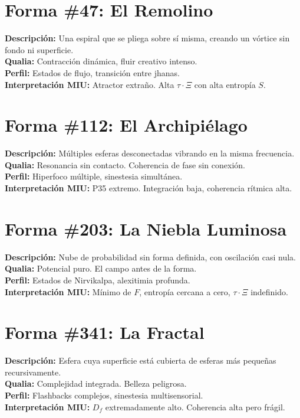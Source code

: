 \documentclass[12pt,openany]{book}
\begin{document}
\section{Forma \#47: El Remolino}
\textbf{Descripción:} Una espiral que se pliega sobre sí misma, creando
un vórtice sin fondo ni superficie.\\
\textbf{Qualia:} Contracción dinámica, fluir creativo intenso.\\
\textbf{Perfil:} Estados de flujo, transición entre jhanas.\\
\textbf{Interpretación MIU:} Atractor extraño. Alta $\tau \cdot \Xi$ con
alta entropía $S$.

\section{Forma \#112: El Archipiélago}
\textbf{Descripción:} Múltiples esferas desconectadas vibrando en la
misma frecuencia.\\
\textbf{Qualia:} Resonancia sin contacto. Coherencia de fase sin conexión.\\
\textbf{Perfil:} Hiperfoco múltiple, sinestesia simultánea.\\
\textbf{Interpretación MIU:} P35 extremo. Integración baja, coherencia
rítmica alta.

\section{Forma \#203: La Niebla Luminosa}
\textbf{Descripción:} Nube de probabilidad sin forma definida, con
oscilación casi nula.\\
\textbf{Qualia:} Potencial puro. El campo antes de la forma.\\
\textbf{Perfil:} Estados de Nirvikalpa, alexitimia profunda.\\
\textbf{Interpretación MIU:} Mínimo de $F$, entropía cercana a cero,
$\tau \cdot \Xi$ indefinido.

\section{Forma \#341: La Fractal}
\textbf{Descripción:} Esfera cuya superficie está cubierta de esferas
más pequeñas recursivamente.\\
\textbf{Qualia:} Complejidad integrada. Belleza peligrosa.\\
\textbf{Perfil:} Flashbacks complejos, sinestesia multisensorial.\\
\textbf{Interpretación MIU:} $D_f$ extremadamente alto. Coherencia alta
pero frágil.
\end{document}
